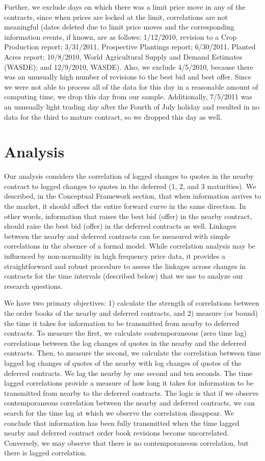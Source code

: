 \documentclass[review,12pt]{elsarticle}
\begin{document}
\begin{linenumbers}
Further, we exclude days on which there was a limit price move in any of
the contracts, since when prices are locked at the limit, correlations
are not meaningful (dates deleted due to limit price moves and the
corresponding information events, if known, are as follows: 1/12/2010,
revision to a Crop Production report; 3/31/2011, Prospective Plantings
report; 6/30/2011, Planted Acres report; 10/8/2010, World Agricultural
Supply and Demand Estimates (WASDE); and 12/9/2010, WASDE). Also, we
exclude 4/5/2010, because there was an unusually high number of
revisions to the best bid and best offer. Since we were not able to
process all of the data for this day in a reasonable amount of computing
time, we drop this day from our sample. Additionally, 7/5/2011 was an
unusually light trading day after the Fourth of July holiday and
resulted in no data for the third to mature contract, so we dropped this
day as well.

\section{Analysis}\label{analysis}

Our analysis considers the correlation of logged changes to quotes in
the nearby contract to logged changes to quotes in the deferred (1, 2,
and 3 maturities). We described, in the Conceptual Framework section,
that when information arrives to the market, it should affect the entire
forward curve in the same direction. In other words, information that
raises the best bid (offer) in the nearby contract, should raise the
best bid (offer) in the deferred contracts as well. Linkages between the
nearby and deferred contracts can be measured with simple correlations
in the absence of a formal model. While correlation analysis may be
influenced by non-normality in high frequency price data, it provides a
straightforward and robust procedure to assess the linkages across
changes in contracts for the time intervals (described below) that we
use to analyze our research questions.

We have two primary objectives: 1) calculate the strength of
correlations between the order books of the nearby and deferred
contracts, and 2) measure (or bound) the time it takes for information
to be transmitted from nearby to deferred contracts. To measure the
first, we calculate contemporaneous (zero time lag) correlations between
the log changes of quotes in the nearby and the deferred contracts.
Then, to measure the second, we calculate the correlation between time
lagged log changes of quotes of the nearby with log changes of quotes of
the deferred contracts. We lag the nearby by one second and ten seconds.
The time lagged correlations provide a measure of how long it takes for
information to be transmitted from nearby to the deferred contracts. The
logic is that if we observe contemporaneous correlation between the
nearby and deferred contracts, we can search for the time lag at which
we observe the correlation disappear. We conclude that information has
been fully transmitted when the time lagged nearby and deferred contract
order book revisions become uncorrelated. Conversely, we may observe
that there is no contemporaneous correlation, but there is lagged
correlation.


\end{linenumbers}
\end{document}
